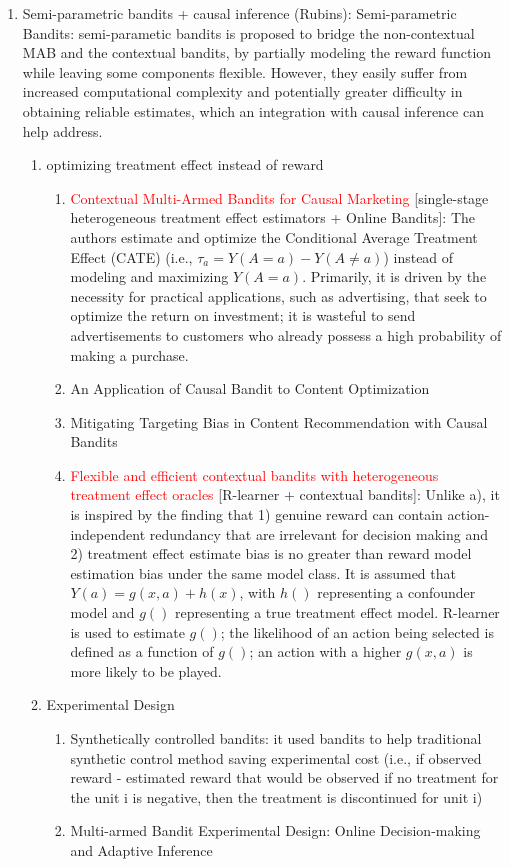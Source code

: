 \begin{enumerate}
\begin{enumerate}
    \item Semi-parametric bandits + causal inference (Rubins): Semi-parametric Bandits: semi-parametic bandits is proposed to bridge the non-contextual MAB and the contextual bandits, by partially modeling the reward function while leaving some components flexible. However, they easily suffer from increased computational complexity and potentially greater difficulty in obtaining reliable estimates, which an integration with causal inference can help address.
        \begin{enumerate}
        \item optimizing treatment effect instead of reward
            \begin{enumerate}
            \item \textcolor{red}{Contextual Multi-Armed Bandits for Causal Marketing} [single-stage heterogeneous treatment effect estimators + Online Bandits]: The authors estimate and optimize the Conditional Average Treatment Effect (CATE) (i.e., $\tau_{a} = Y(A = a)- Y(A\neq a)$) instead of modeling and maximizing $Y(A = a)$. Primarily, it is driven by the necessity for practical applications, such as advertising, that seek to optimize the return on investment; it is wasteful to send advertisements to customers who already possess a high probability of making a purchase.
            \item An Application of Causal Bandit to Content Optimization
            \item Mitigating Targeting Bias in Content Recommendation with Causal Bandits
            \item \textcolor{red}{Flexible and efficient contextual bandits with heterogeneous treatment effect oracles} [R-learner + contextual bandits]: Unlike a), it is inspired by the finding that 1) genuine reward can contain action-independent redundancy that are irrelevant for decision making and 2) treatment effect estimate bias is no greater than reward model estimation bias under the same model class. It is assumed that $Y(a) = g(x,a) + h(x)$, with $h()$ representing a confounder model and $g()$ representing a true treatment effect model. R-learner is used to estimate $g()$; the likelihood of an action being selected is defined as a function of $g()$; an action with a higher $g(x,a)$ is more likely to be played.
            \end{enumerate}
        \item Experimental Design
            \begin{enumerate}
            \item Synthetically controlled bandits: it used bandits to help traditional synthetic control method saving experimental cost (i.e., if observed reward - estimated reward that would be observed if no treatment for the unit i is negative, then the treatment is discontinued for unit i) 
            \item Multi-armed Bandit Experimental Design: Online Decision-making and Adaptive Inference
            \end{enumerate}
        \end{enumerate}
    \end{enumerate}



\end{enumerate}
